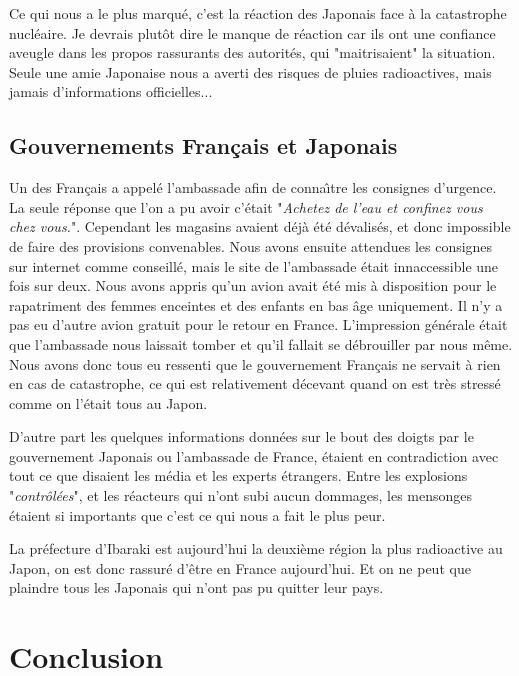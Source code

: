 \documentclass[journal]{RapportFR}
\begin{document}
\begin{CJK*}{UTF8}{min}
Ce qui nous a le plus marqu\'e, c'est la r\'eaction des Japonais face \`a la catastrophe nucl\'eaire. Je devrais plut\^ot dire le manque de r\'eaction car ils ont une confiance aveugle dans les propos rassurants des autorit\'es, qui "maitrisaient" la situation. Seule une amie Japonaise nous a averti des risques de pluies radioactives, mais jamais d'informations officielles...

\subsection{Gouvernements Fran\c cais et Japonais}

Un des Fran\c cais a appel\'e l'ambassade afin de conna\^\i tre les consignes d'urgence. La seule r\'eponse que l'on a pu avoir c'\'etait "\textit{Achetez de l'eau et confinez vous chez vous.}". Cependant les magasins avaient d\'ej\`a \'et\'e d\'evalis\'es, et donc impossible de faire des provisions convenables.
Nous avons ensuite attendues les consignes sur internet comme conseill\'e, mais le site de l'ambassade \'etait innaccessible une fois sur deux. Nous avons appris qu'un avion avait \'et\'e mis \`a disposition pour le rapatriment des femmes enceintes et des enfants en bas \^age uniquement. Il n'y a pas eu d'autre avion gratuit pour le retour en France.
L'impression g\'en\'erale \'etait que l'ambassade nous laissait tomber et qu'il fallait se d\'ebrouiller par nous m\^eme. Nous avons donc tous eu ressenti que le gouvernement Fran\c cais ne servait \`a rien en cas de catastrophe, ce qui est relativement d\'ecevant quand on est tr\`es stress\'e comme on l'\'etait tous au Japon.

D'autre part les quelques informations donn\'ees sur le bout des doigts par le gouvernement Japonais ou l'ambassade de France, \'etaient en contradiction avec tout ce que disaient les m\'edia et les experts \'etrangers. Entre les explosions "\textit{contr\^ol\'ees}", et les r\'eacteurs qui n'ont subi aucun dommages, les mensonges \'etaient si importants que c'est ce qui nous a fait le plus peur.

La pr\'efecture d'Ibaraki est aujourd'hui la deuxi\`eme r\'egion la plus radioactive au Japon, on est donc rassur\'e d'\^etre en France aujourd'hui. Et on ne peut que plaindre tous les Japonais qui n'ont pas pu quitter leur pays.


\section{Conclusion}


\end{CJK*}
\end{document}
